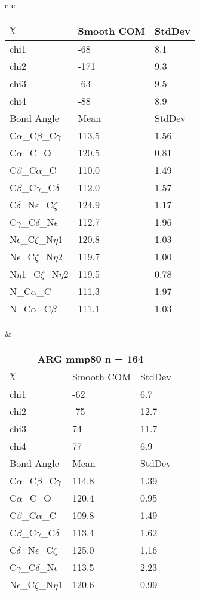 \begin{longtable}{ c c }
\begin{tabular}{ l l l }
  $\chi$       & Smooth COM & StdDev \\ \midrule
  chi1 & -68 & 8.1 \\ 
  chi2 & -171 & 9.3 \\ 
  chi3 & -63 & 9.5 \\ 
  chi4 & -88 & 8.9 \\ \midrule
  Bond Angle   & Mean     & StdDev \\ \midrule
  C$\alpha$\_C$\beta$\_C$\gamma$ & 113.5 & 1.56\\
  C$\alpha$\_C\_O & 120.5 & 0.81\\
  C$\beta$\_C$\alpha$\_C & 110.0 & 1.49\\
  C$\beta$\_C$\gamma$\_C$\delta$ & 112.0 & 1.57\\
  C$\delta$\_N$\epsilon$\_C$\zeta$ & 124.9 & 1.17\\
  C$\gamma$\_C$\delta$\_N$\epsilon$ & 112.7 & 1.96\\
  N$\epsilon$\_C$\zeta$\_N$\eta$1 & 120.8 & 1.03\\
  N$\epsilon$\_C$\zeta$\_N$\eta$2 & 119.7 & 1.00\\
  N$\eta$1\_C$\zeta$\_N$\eta$2 & 119.5 & 0.78\\
  N\_C$\alpha$\_C & 111.3 & 1.97\\
  N\_C$\alpha$\_C$\beta$ & 111.1 & 1.03\\
  \bottomrule
  \end{tabular}
  &
  \begin{tabular}{ l l l }
  \toprule
  \multicolumn{3}{c}{ARG \textbf{mmp80} n = 164} \\ \toprule
  $\chi$       & Smooth COM & StdDev \\ \midrule
  chi1 & -62 & 6.7 \\ 
  chi2 & -75 & 12.7 \\ 
  chi3 & 74 & 11.7 \\ 
  chi4 & 77 & 6.9 \\ \midrule
  Bond Angle   & Mean     & StdDev \\ \midrule
  C$\alpha$\_C$\beta$\_C$\gamma$ & 114.8 & 1.39\\
  C$\alpha$\_C\_O & 120.4 & 0.95\\
  C$\beta$\_C$\alpha$\_C & 109.8 & 1.49\\
  C$\beta$\_C$\gamma$\_C$\delta$ & 113.4 & 1.62\\
  C$\delta$\_N$\epsilon$\_C$\zeta$ & 125.0 & 1.16\\
  C$\gamma$\_C$\delta$\_N$\epsilon$ & 113.5 & 2.23\\
  N$\epsilon$\_C$\zeta$\_N$\eta$1 & 120.6 & 0.99\\

\end{tabular}
\end{longtable}
